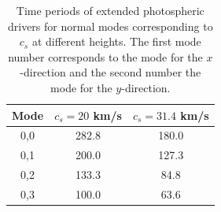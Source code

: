 \documentclass[preprint,authoryear,12pt]{elsarticle}
\begin{document}
\begin{table}
\centering
\begin{tabular}{c c c }
\hline
Mode   &  $c_s=20$ km/s &  $c_s=31.4$ km/s \\
\hline
0,0 & 282.8 & 180.0 \\
\hline
0,1 & 200.0 & 127.3  \\
\hline
0,2 & 133.3 & 84.8  \\
\hline
0,3 & 100.0 & 63.6  \\
\hline
\end{tabular} 
\caption{Time periods of extended photospheric drivers for normal modes corresponding to $c_s$ at different heights. The first mode number corresponds to the mode for the $x$-direction and the second number the mode for the $y$-direction.}
\label{Table2}
\end{table}




\end{document}
